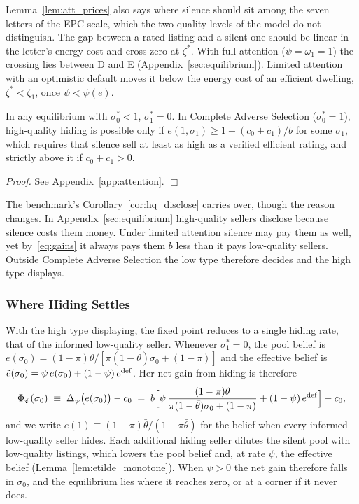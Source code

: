 Lemma~\ref{lem:att_prices} also says where silence should sit among the seven letters of the EPC scale, which the two quality levels of the model do not distinguish. The gap between a rated listing and a silent one should be linear in the letter's energy cost and cross zero at $\zeta^*$. With full attention ($\psi=\omega_1=1$) the crossing lies between D and E (Appendix~\ref{sec:equilibrium}). Limited attention with an optimistic default moves it below the energy cost of an efficient dwelling, $\zeta^*<\zeta_1$, once $\psi<\bar\psi(e)$.


\begin{corollary}
\label{cor:att_hq}
In any equilibrium with $\sigma_0^*<1$, $\sigma_1^*=0$. In Complete Adverse Selection ($\sigma_0^*=1$), high-quality hiding is possible only if $\tilde e(1,\sigma_1)\ge1+(c_0+c_1)/b$ for some $\sigma_1$, which requires that silence sell at least as high as a verified efficient rating, and strictly above it if $c_0+c_1>0$.
\end{corollary}

\noindent\textit{Proof.} See Appendix~\ref{app:attention}. $\Box$

The benchmark's Corollary~\ref{cor:hq_disclose} carries over, though the reason changes. In Appendix~\ref{sec:equilibrium} high-quality sellers disclose because silence costs them money. Under limited attention silence may pay them as well, yet by~\eqref{eq:gains} it always pays them $b$ less than it pays low-quality sellers. Outside Complete Adverse Selection the low type therefore decides and the high type displays.

\subsubsection{Where Hiding Settles}
\label{ss:att_where}

With the high type displaying, the fixed point reduces to a single hiding rate, that of the informed low-quality seller. Whenever $\sigma_1^*=0$, the pool belief is $e(\sigma_0)=(1-\pi)\bar\theta/[\pi(1-\bar\theta)\sigma_0+(1-\pi)]$ and the effective belief is $\tilde e(\sigma_0)=\psi\,e(\sigma_0)+(1-\psi)\,e^{\rm def}$. Her net gain from hiding is therefore
\begin{equation}
    \Phi_\psi(\sigma_0)\;\equiv\;\Delta_\psi\big(e(\sigma_0)\big)-c_0\;=\;b\Big[\psi\,\frac{(1-\pi)\bar\theta}{\pi(1-\bar\theta)\sigma_0+(1-\pi)}+(1-\psi)\,e^{\rm def}\Big]-c_0,
    \label{eq:Phi_psi}
\end{equation}
and we write $e(1)\equiv(1-\pi)\bar\theta/(1-\pi\bar\theta)$ for the belief when every informed low-quality seller hides. Each additional hiding seller dilutes the silent pool with low-quality listings, which lowers the pool belief and, at rate $\psi$, the effective belief (Lemma~\ref{lem:etilde_monotone}). When $\psi>0$ the net gain therefore falls in $\sigma_0$, and the equilibrium lies where it reaches zero, or at a corner if it never does.

